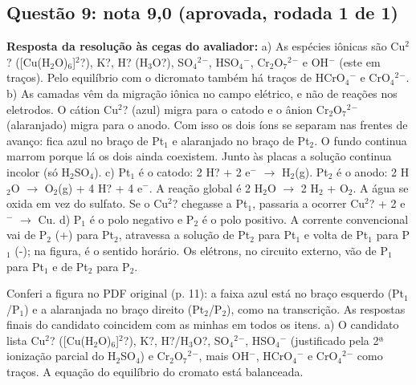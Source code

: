 \documentclass{article}%
\begin{document}
\subsection*{Questão 9: nota 9,0 (aprovada, rodada 1 de 1)}%
\textbf{Resposta da resolução às cegas do avaliador:} a) As espécies iônicas são Cu$^2$? ({[}Cu(H$_{2}$O)$_{6}${]}$^2$?), K?, H? (H$_{3}$O?), SO$_{4}$$^2$$^{-}$, HSO$_{4}$$^{-}$, Cr$_{2}$O$_{7}$$^2$$^{-}$ e OH$^{-}$ (este em traços). Pelo equilíbrio com o dicromato também há traços de HCrO$_{4}$$^{-}$ e CrO$_{4}$$^2$$^{-}$.\newline%
\newline%
b) As camadas vêm da migração iônica no campo elétrico, e não de reações nos eletrodos. O cátion Cu$^2$? (azul) migra para o catodo e o ânion Cr$_{2}$O$_{7}$$^2$$^{-}$ (alaranjado) migra para o anodo. Com isso os dois íons se separam nas frentes de avanço: fica azul no braço de Pt$_{1}$ e alaranjado no braço de Pt$_{2}$. O fundo continua marrom porque lá os dois ainda coexistem. Junto às placas a solução continua incolor (só H$_{2}$SO$_{4}$).\newline%
\newline%
c) Pt$_{1}$ é o catodo: 2 H? + 2 e$^{-}$ $\to$ H$_{2}$(g). Pt$_{2}$ é o anodo: 2 H$_{2}$O $\to$ O$_{2}$(g) + 4 H? + 4 e$^{-}$. A reação global é 2 H$_{2}$O $\to$ 2 H$_{2}$ + O$_{2}$. A água se oxida em vez do sulfato. Se o Cu$^2$? chegasse a Pt$_{1}$, passaria a ocorrer Cu$^2$? + 2 e$^{-}$ $\to$ Cu.\newline%
\newline%
d) P$_{1}$ é o polo negativo e P$_{2}$ é o polo positivo. A corrente convencional vai de P$_{2}$ (+) para Pt$_{2}$, atravessa a solução de Pt$_{2}$ para Pt$_{1}$ e volta de Pt$_{1}$ para P$_{1}$ (-); na figura, é o sentido horário. Os elétrons, no circuito externo, vão de P$_{1}$ para Pt$_{1}$ e de Pt$_{2}$ para P$_{2}$.\par %
Conferi a figura no PDF original (p. 11): a faixa azul está no braço esquerdo (Pt$_{1}$/P$_{1}$) e a alaranjada no braço direito (Pt$_{2}$/P$_{2}$), como na transcrição. As respostas finais do candidato coincidem com as minhas em todos os itens.\newline%
\newline%
a) O candidato lista Cu$^2$? ({[}Cu(H$_{2}$O)$_{6}${]}$^2$?), K?, H?/H$_{3}$O?, SO$_{4}$$^2$$^{-}$, HSO$_{4}$$^{-}$ (justificado pela 2ª ionização parcial do H$_{2}$SO$_{4}$) e Cr$_{2}$O$_{7}$$^2$$^{-}$, mais OH$^{-}$, HCrO$_{4}$$^{-}$ e CrO$_{4}$$^2$$^{-}$ como traços. A equação do equilíbrio do cromato está balanceada.\newline%
\end{document}
